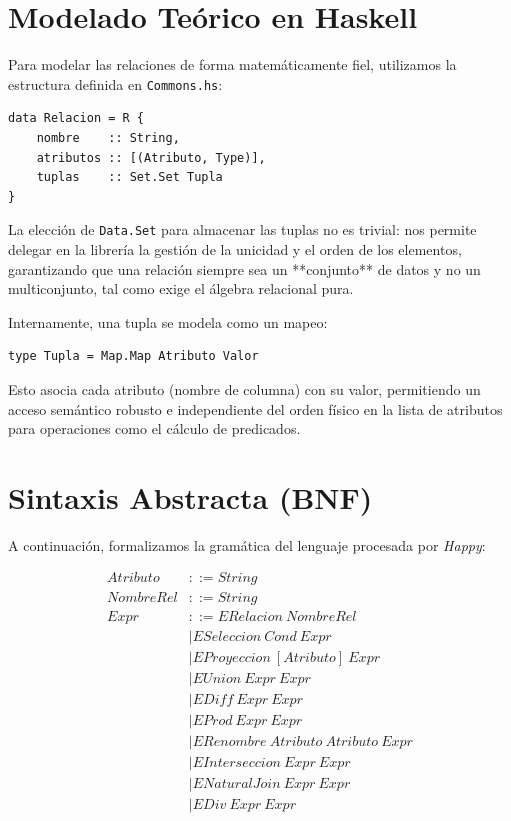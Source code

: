 \documentclass[12pt]{report}
\newcommand{\bnf}{::=}
\begin{document}
\section{Modelado Teórico en Haskell}
Para modelar las relaciones de forma matemáticamente fiel, utilizamos la estructura definida en \texttt{Commons.hs}:

\begin{lstlisting}
data Relacion = R {
    nombre    :: String,
    atributos :: [(Atributo, Type)],
    tuplas    :: Set.Set Tupla
}
\end{lstlisting}

La elección de \texttt{Data.Set} para almacenar las tuplas no es trivial: nos permite delegar en la librería la gestión de la unicidad y el orden de los elementos, garantizando que una relación siempre sea un **conjunto** de datos y no un multiconjunto, tal como exige el álgebra relacional pura.

Internamente, una tupla se modela como un mapeo:
\begin{lstlisting}
type Tupla = Map.Map Atributo Valor
\end{lstlisting}
Esto asocia cada atributo (nombre de columna) con su valor, permitiendo un acceso semántico robusto e independiente del orden físico en la lista de atributos para operaciones como el cálculo de predicados.

\section{Sintaxis Abstracta (BNF)}
A continuación, formalizamos la gramática del lenguaje procesada por \textit{Happy}:

\begin{align*}
Atributo &\bnf String \\
NombreRel &\bnf String \\
Expr &\bnf ERelacion\ NombreRel \\
     &\mid ESeleccion\ Cond\ Expr \\
     &\mid EProyeccion\ [Atributo]\ Expr \\
     &\mid EUnion\ Expr\ Expr \\
     &\mid EDiff\ Expr\ Expr \\
     &\mid EProd\ Expr\ Expr \\
     &\mid ERenombre\ Atributo\ Atributo\ Expr \\
     &\mid EInterseccion\ Expr\ Expr \\
     &\mid ENaturalJoin\ Expr\ Expr \\
     &\mid EDiv\ Expr\ Expr 
\end{align*}
\end{document}
